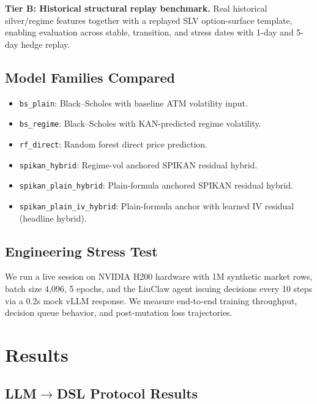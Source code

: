 \documentclass[11pt,a4paper]{article}
\begin{document}
\textbf{Tier B: Historical structural replay benchmark.} Real historical silver/regime features together with a replayed SLV option-surface template, enabling evaluation across stable, transition, and stress dates with 1-day and 5-day hedge replay.

\subsection{Model Families Compared}

\begin{itemize}
  \item \texttt{bs\_plain}: Black--Scholes with baseline ATM volatility input.
  \item \texttt{bs\_regime}: Black--Scholes with KAN-predicted regime volatility.
  \item \texttt{rf\_direct}: Random forest direct price prediction.
  \item \texttt{spikan\_hybrid}: Regime-vol anchored SPIKAN residual hybrid.
  \item \texttt{spikan\_plain\_hybrid}: Plain-formula anchored SPIKAN residual hybrid.
  \item \texttt{spikan\_plain\_iv\_hybrid}: Plain-formula anchor with learned IV residual (headline hybrid).
\end{itemize}

\subsection{Engineering Stress Test}

We run a live session on NVIDIA H200 hardware with 1M synthetic market rows, batch size 4,096, 5 epochs, and the LiuClaw agent issuing decisions every 10 steps via a 0.2s mock vLLM response. We measure end-to-end training throughput, decision queue behavior, and post-mutation loss trajectories.

\section{Results}
\label{sec:results}

\subsection{LLM$\to$DSL Protocol Results}
\end{document}

